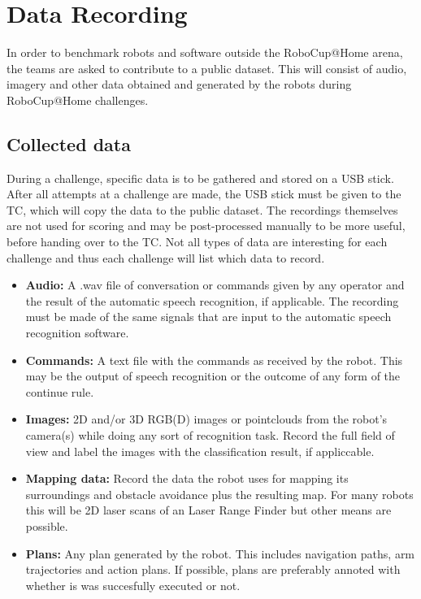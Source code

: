 \section{Data Recording}
  In order to benchmark robots and software outside the RoboCup@Home arena, the teams are asked to contribute to a public dataset.
  This will consist of audio, imagery and other data obtained and generated by the robots during RoboCup@Home challenges.
  
  \subsection{Collected data}
    During a challenge, specific data is to be gathered and stored on a USB stick. 
    After all attempts at a challenge are made, the USB stick must be given to the TC, which will copy the data to the public dataset.
    The recordings themselves are not used for scoring and may be post-processed manually to be more useful, before handing over to the TC. 
    Not all types of data are interesting for each challenge and thus each challenge will list which data to record. 
    
    \begin{itemize}
    \item \textbf{Audio: } A .wav file of conversation or commands given by any operator and the result of the automatic speech recognition, if applicable.
      The recording must be made of the same signals that are input to the automatic speech recognition software. 
    \item \textbf{Commands: } A text file with the commands as received by the robot. 
      This may be the output of speech recognition or the outcome of any form of the continue rule.
    \item \textbf{Images: } 2D and/or 3D RGB(D) images or pointclouds from the robot's camera(s) while doing any sort of recognition task.
			    Record the full field of view and label the images with the classification result, if appliccable.
    \item \textbf{Mapping data: } Record the data the robot uses for mapping its surroundings and obstacle avoidance plus the resulting map. 
      For many robots this will be 2D laser scans of an Laser Range Finder but other means are possible. 
    \item \textbf{Plans: } Any plan generated by the robot. This includes navigation paths, arm trajectories and action plans. 
      If possible, plans are preferably annoted with whether is was succesfully executed or not.
    \end{itemize}
    
